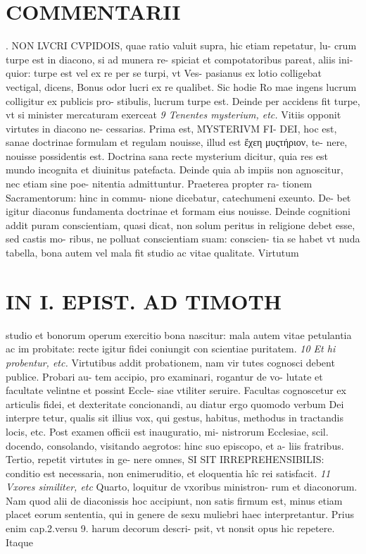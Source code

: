 \documentclass{article}
\begin{document}
\begin{pages}
\section*{COMMENTARII }. NON LVCRI CVPIDOIS, quae ratio valuit supra, hic etiam repetatur, lu- crum turpe est in diacono, si ad munera re- spiciat et compotatoribus pareat, aliis ini- quior: turpe est vel ex re per se turpi, vt Ves- pasianus ex lotio colligebat vectigal, dicens, Bonus odor lucri ex re qualibet. Sic hodie Ro mae ingens lucrum colligitur ex publicis pro- stibulis, lucrum turpe est. Deinde per accidens fit turpe, vt si minister mercaturam exerceat  \pend
\textit{9 Tenentes mysterium, etc. }\pstart Vitiis opponit virtutes in diacono ne- cessarias. Prima est, MYSTERIVM FI- DEI, hoc est, sanae doctrinae formulam et regulam nouisse, illud est ἔχεη μυςτήριον, te- nere, nouisse possidentis est. Doctrina sana recte mysterium dicitur, quia res est mundo incognita et diuinitus patefacta. Deinde quia ab impiis non agnoscitur, nec etiam sine poe- nitentia admittuntur. Praeterea propter ra- tionem Sacramentorum: hinc in commu- nione dicebatur, catechumeni exeunto. De- bet igitur diaconus fundamenta doctrinae et formam eius nouisse. Deinde cognitioni addit puram conscientiam, quasi dicat, non solum peritus in religione debet esse, sed castis mo- ribus, ne polluat conscientiam suam: conscien- tia se habet vt nuda tabella, bona autem vel mala fit studio ac vitae qualitate. Virtutum  \pend
\section*{IN I. EPIST. AD TIMOTH }
\marginpar{[ p.73 ]}\pstart studio et bonorum operum exercitio bona nascitur: mala autem vitae petulantia ac im probitate: recte igitur fidei coniungit con scientiae puritatem.  \pend
\textit{10 Et hi probentur, etc. }\pstart Virtutibus addit probationem, nam vir tutes cognosci debent publice. Probari au- tem accipio, pro examinari, rogantur de vo- lutate et facultate velintne et possint Eccle- siae vtiliter seruire. Facultas cognoscetur ex articulis fidei, et dexteritate concionandi, au diatur ergo quomodo verbum Dei interpre tetur, qualis sit illius vox, qui gestus, habitus, methodus in tractandis locis, etc.  \pend\pstart Post examen officii est inauguratio, mi- nistrorum Ecclesiae, scil. docendo, consolando, visitando aegrotos: hinc suo episcopo, et a- liis fratribus. Tertio, repetit virtutes in ge- nere omnes, SI SIT IRREPREHENSIBILIS: conditio est necessaria, non enimeruditio, et eloquentia hîc rei satisfacit.  \pend
\textit{11 Vxores similiter, etc }\pstart Quarto, loquitur de vxoribus ministron- rum et diaconorum. Nam quod alii de diaconissis hoc accipiunt, non satis firmum est, minus etiam placet eorum sententia, qui in genere de sexu muliebri haec interpretantur. Prius enim cap.2.versu 9. harum decorum descri- psit, vt nonsit opus hic repetere. Itaque  \pend
\marginpar{[ p.74 ]}

\end{pages}
\end{document}
